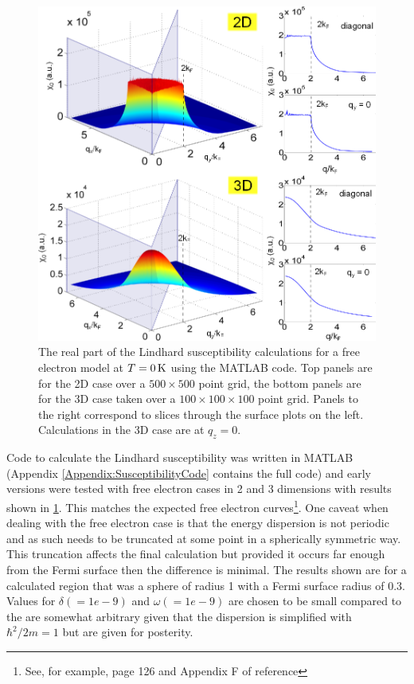 \begin{figure}[htbp]
    \begin{center}
        \includegraphics[scale=0.9]{Chapter3-dHvABaFe2P2/Figures/AngleDepMeasurements/SusceptibilityFreeElectron/SusceptibilityFreeElectron}
        \caption{The real part of the Lindhard susceptibility calculations for a free electron model at $T=\unit[0]{K}$ using the MATLAB  code. Top panels are for the 2D case over a $500\times500$ point grid, the bottom panels are for the 3D case taken over a $100\times100\times100$ point grid. Panels to the right correspond to slices through the surface plots on the left. Calculations in the 3D case are at $q_z=0$.}
        \label{Fig:3:FreeElectronSusceptibility}
    \end{center}
\end{figure}

Code to calculate the Lindhard susceptibility was written in MATLAB (Appendix \ref{Appendix:SusceptibilityCode} contains the full code) and early versions were tested with free electron cases in 2 and 3 dimensions with results shown in \fig\ref{Fig:3:FreeElectronSusceptibility}. This matches the expected free electron curves\footnote{See, for example, page 126 and Appendix F of reference\cite{Dressel2002}}. One caveat when dealing with the free electron case is that the energy dispersion is not periodic and as such needs to be truncated at some point in a spherically symmetric way. This truncation affects the final calculation but provided it occurs far enough from the Fermi surface then the difference is minimal. The results shown are for a calculated region that was a sphere of radius 1 with a Fermi surface radius of 0.3. Values for $\delta(=1e-9)$ and $\omega(=1e-9)$ are chosen to be small compared to the   are somewhat arbitrary given that the dispersion is simplified with $\hbar^2/2m = 1$ but are given for posterity. 

